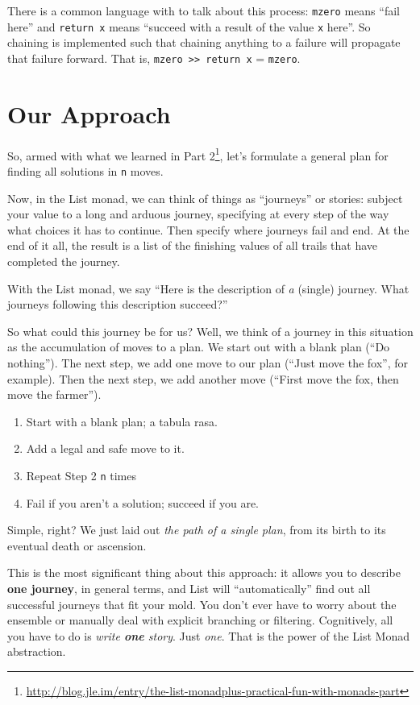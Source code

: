 \documentclass[]{article}
\renewcommand{\href}[2]{#2\footnote{\url{#1}}}
\begin{document}
There is a common language with to talk about this process:
\texttt{mzero} means ``fail here'' and \texttt{return\ x} means
``succeed with a result of the value \texttt{x} here''. So chaining is
implemented such that chaining anything to a failure will propagate that
failure forward. That is,
\texttt{mzero\ \textgreater{}\textgreater{}\ return\ x} =
\texttt{mzero}.

\section{Our Approach}\label{our-approach}

So, armed with what we learned in
\href{http://blog.jle.im/entry/the-list-monadplus-practical-fun-with-monads-part}{Part
2}, let's formulate a general plan for finding all solutions in
\texttt{n} moves.

Now, in the List monad, we can think of things as ``journeys'' or
stories: subject your value to a long and arduous journey, specifying at
every step of the way what choices it has to continue. Then specify
where journeys fail and end. At the end of it all, the result is a list
of the finishing values of all trails that have completed the journey.

With the List monad, we say ``Here is the description of \emph{a}
(single) journey. What journeys following this description succeed?''

So what could this journey be for us? Well, we think of a journey in
this situation as the accumulation of moves to a plan. We start out with
a blank plan (``Do nothing''). The next step, we add one move to our
plan (``Just move the fox'', for example). Then the next step, we add
another move (``First move the fox, then move the farmer'').

\begin{enumerate}
\def\labelenumi{\arabic{enumi}.}
\tightlist
\item
  Start with a blank plan; a tabula rasa.
\item
  Add a legal and safe move to it.
\item
  Repeat Step 2 \texttt{n} times
\item
  Fail if you aren't a solution; succeed if you are.
\end{enumerate}

Simple, right? We just laid out \emph{the path of a single plan}, from
its birth to its eventual death or ascension.

This is the most significant thing about this approach: it allows you to
describe \textbf{one journey}, in general terms, and List will
``automatically'' find out all successful journeys that fit your mold.
You don't ever have to worry about the ensemble or manually deal with
explicit branching or filtering. Cognitively, all you have to do is
\emph{write \textbf{one} story}. Just \emph{one}. That is the power of
the List Monad abstraction.
\end{document}
